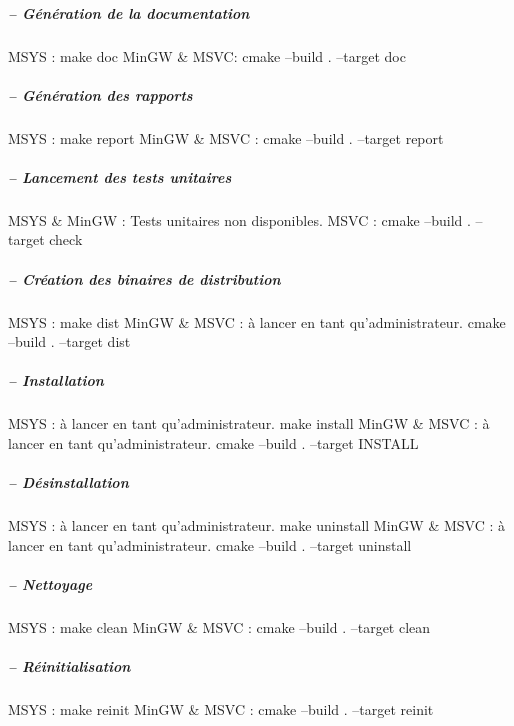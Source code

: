 \subparagraph*{-- Génération de la documentation}

\begin{DoxyVerb}MSYS :
    make doc
MinGW & MSVC:
    cmake --build . --target doc
\end{DoxyVerb}


\subparagraph*{-- Génération des rapports}

\begin{DoxyVerb}MSYS :
    make report
MinGW & MSVC :
    cmake --build . --target report
\end{DoxyVerb}


\subparagraph*{-- Lancement des tests unitaires}

\begin{DoxyVerb}MSYS & MinGW :
    Tests unitaires non disponibles.
MSVC :
    cmake --build . --target check
\end{DoxyVerb}


\subparagraph*{-- Création des binaires de distribution}

\begin{DoxyVerb}MSYS :
    make dist
MinGW & MSVC : à lancer en tant qu'administrateur.
    cmake --build . --target dist
\end{DoxyVerb}


\subparagraph*{-- Installation}

\begin{DoxyVerb}MSYS : à lancer en tant qu'administrateur.
    make install
MinGW & MSVC : à lancer en tant qu'administrateur.
    cmake --build . --target INSTALL
\end{DoxyVerb}


\subparagraph*{-- Désinstallation}

\begin{DoxyVerb}MSYS : à lancer en tant qu'administrateur.
    make uninstall
MinGW & MSVC : à lancer en tant qu'administrateur.
    cmake --build . --target uninstall
\end{DoxyVerb}


\subparagraph*{-- Nettoyage}

\begin{DoxyVerb}MSYS :
    make clean
MinGW & MSVC :
    cmake --build . --target clean
\end{DoxyVerb}


\subparagraph*{-- Réinitialisation}

\begin{DoxyVerb}MSYS :
    make reinit
MinGW & MSVC :
    cmake --build . --target reinit\end{DoxyVerb}
 